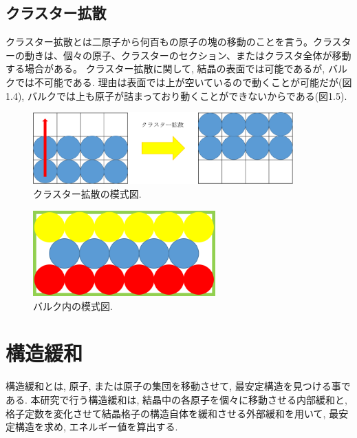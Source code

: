 \subsection{クラスター拡散}
クラスター拡散とは二原子から何百もの原子の塊の移動のことを言う。クラスターの動きは、個々の原子、クラスターのセクション、またはクラスタ全体が移動する場合がある。
クラスター拡散に関して, 結晶の表面では可能であるが, バルクでは不可能である.
理由は表面では上が空いているので動くことが可能だが(図1.4), バルクでは上も原子が詰まっており動くことができないからである(図1.5).

\begin{figure}[htbp]
	\begin{center}
		\includegraphics[width=100mm]{../intro/kakusan.png}
		\caption{クラスター拡散の模式図.}
		\label{default}
	\end{center}
\end{figure}

\begin{figure}[htbp]
	\begin{center}
		\includegraphics[width=70mm]{../intro/balc.png}
        \caption{バルク内の模式図.}
		\label{default}
	\end{center}
\end{figure}

\section{構造緩和}
構造緩和とは, 原子, または原子の集団を移動させて, 最安定構造を見つける事である. 本研究で行う構造緩和は, 結晶中の各原子を個々に移動させる内部緩和と, 格子定数を変化させて結晶格子の構造自体を緩和させる外部緩和を用いて, 最安定構造を求め, エネルギー値を算出する.

